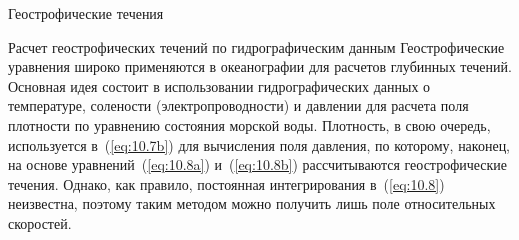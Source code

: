 \begin{chapter}{Геострофические течения}
\begin{section}{Расчет геострофических течений по гидрографическим данным}\label{sec:10.4}
Геострофические уравнения широко применяются в океанографии для
расчетов глубинных течений. Основная идея состоит в использовании
гидрографических данных о температуре, 
солености (электропроводности) и давлении для расчета поля плотности 
по уравнению состояния морской воды. Плотность, в свою очередь, 
используется в~(\ref{eq:10.7b}) для вычисления поля
давления, по которому, наконец, на основе уравнений~(\ref{eq:10.8a}) 
и~(\ref{eq:10.8b}) рассчитываются геострофические течения. Однако, как правило, 
постоянная интегрирования в~(\ref{eq:10.8}) неизвестна, поэтому таким методом 
можно получить лишь поле относительных скоростей.
%


\end{section}
\end{chapter}
